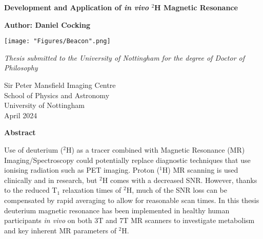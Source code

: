 \documentclass[12pt,english]{report}
\begin{document}
 

\setlength{\headheight}{25pt}

\begin{titlepage}
   \begin{center}
 
       \textbf{\huge{Development and Application of \textit{in vivo} $^2$H Magnetic Resonance}}
 
       \vspace{1cm}
 
       \huge{\textbf{Author: Daniel Cocking} \\}
       
       \vspace{1.5cm}
       \texttt{[image: "Figures/Beacon".png]}
       \vspace{1cm}
       
       \Large{\emph{Thesis submitted to the University of Nottingham for the degree of Doctor of Philosophy}} 
 
 \vspace{2cm}
 
       Sir Peter Mansfield Imaging Centre \\
       School of Physics and Astronomy\\
       University of Nottingham\\
       April 2024
 
   \end{center}
\end{titlepage}
\thispagestyle{empty}
\vspace*{\fill}

\newpage
\thispagestyle{plain}
\setcounter{page}{1}
\begin{center}
    \textbf{Abstract}
\end{center}
Use of deuterium ($^2$H) as a tracer combined with Magnetic Resonance (MR) Imaging/Spectroscopy could potentially replace diagnostic techniques that use ionising radiation such as \ac{PET} imaging. Proton ($^1$H) MR scanning is used clinically and in research, but $^2$H comes with a decreased \ac{SNR}. However, thanks to the reduced T$_1$ relaxation times of $^2$H, much of the \ac{SNR} loss can be compensated by rapid averaging to allow for reasonable scan times. In this thesis deuterium magnetic resonance has been implemented in healthy human participants \textit{in vivo} on both 3T and 7T MR scanners to investigate metabolism and key inherent MR parameters of $^2$H.
\end{document}
